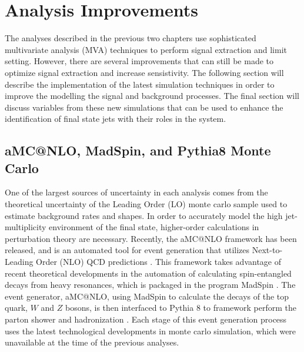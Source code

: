 \chapter{Analysis Improvements}
\label{analysis_improvements_overview}

\par The analyses described in the previous two chapters use
sophisticated multivariate analysis (MVA) techniques to perform signal
extraction and limit setting.  However, there are several improvements
that can still be made to optimize signal extraction and increase
sensistivity.  The following section will describe the implementation
of the latest simulation techniques in order to improve the modelling
the signal and background processes.  The final section will discuss
variables from these new simulations that can be used to enhance the
identification of final state jets with their roles in the \ttbar
system.   


%



\section{aMC@NLO, MadSpin, and Pythia8 Monte Carlo}
\label{aMCatNLO_pythia8_overview}

\par One of the largest sources of uncertainty in each analysis comes
from the theoretical uncertainty of the Leading Order (LO) monte carlo
sample  used to estimate background rates and shapes.  In order to
accurately model the high jet-multiplicity environment of the \ttH
final state, higher-order calculations in perturbation theory are
necessary.  Recently, the aMC@NLO framework has been released, and is
an automated tool for event generation that utilizes Next-to-Leading
Order (NLO) QCD predictions \cite{Alwall:2014hca}.  This framework
takes advantage of recent theoretical developments in the automation
of calculating spin-entangled decays from heavy resonances, which is
packaged in the program MadSpin \cite{Artoisenet:2012st}.  The event
generator, aMC@NLO, using MadSpin to calculate the decays of the top
quark, $W$ and $Z$ bosons, is then interfaced to Pythia 8 to framework
perform the parton shower and hadronization \cite{Sjostrand:2007gs}.
Each stage of this event generation process uses the latest
technological developments in monte carlo simulation, which were
unavailable at the time of the previous analyses.  

